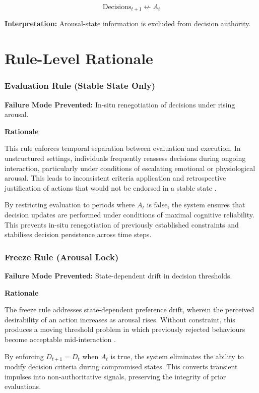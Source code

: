\documentclass{article}
\begin{document}
	\[
	\text{Decisions}_{t+1} \not\gets A_t
	\]
	
	\textbf{Interpretation:}  
	Arousal-state information is excluded from decision authority.
	
	\section*{Rule-Level Rationale}
	
	\subsubsection*{Evaluation Rule (Stable State Only)}
	
	\textbf{Failure Mode Prevented:} In-situ renegotiation of decisions under rising arousal.
	
	\textbf{Rationale}
	
	This rule enforces temporal separation between evaluation and execution. In unstructured settings, individuals frequently reassess decisions during ongoing interaction, particularly under conditions of escalating emotional or physiological arousal. This leads to inconsistent criteria application and retrospective justification of actions that would not be endorsed in a stable state \cite{constraint_relaxation}.
	
	By restricting evaluation to periods where $A_t$ is false, the system ensures that decision updates are performed under conditions of maximal cognitive reliability. This prevents in-situ renegotiation of previously established constraints and stabilises decision persistence across time steps.
	
	\subsubsection*{Freeze Rule (Arousal Lock)}
	
	\textbf{Failure Mode Prevented:} State-dependent drift in decision thresholds.
	
	\textbf{Rationale}
	
	The freeze rule addresses state-dependent preference drift, wherein the perceived desirability of an action increases as arousal rises. Without constraint, this produces a moving threshold problem in which previously rejected behaviours become acceptable mid-interaction \cite{temporal_inconsistency}.
	
	By enforcing $D_{t+1} = D_t$ when $A_t$ is true, the system eliminates the ability to modify decision criteria during compromised states. This converts transient impulses into non-authoritative signals, preserving the integrity of prior evaluations.
	
\end{document}
